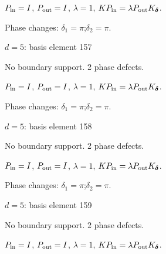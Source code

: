 \vspace{-1mm}
$P_{\rm in}=I$, \quad $P_{\rm out}=I$, \quad $\lambda=1$, \qquad $K P_{\rm in}=\lambda P_{\rm out}K_{\boldsymbol\delta}$.
\par\smallskip\begin{minipage}{.98\linewidth}\small Phase changes: $\delta_{1}=\pi$;\quad $\delta_{2}=\pi$.\end{minipage}
\vfill
{\footnotesize\texttt{}}
\newpage
{}
{\Large $d=5$: basis element 157}\par
No boundary support. 2 phase defects.
\begin{center}
\end{center}
\vspace{-1mm}
$P_{\rm in}=I$, \quad $P_{\rm out}=I$, \quad $\lambda=1$, \qquad $K P_{\rm in}=\lambda P_{\rm out}K_{\boldsymbol\delta}$.
\par\smallskip\begin{minipage}{.98\linewidth}\small Phase changes: $\delta_{1}=\pi$;\quad $\delta_{2}=\pi$.\end{minipage}
\vfill
{\footnotesize\texttt{}}
\newpage
{}
{\Large $d=5$: basis element 158}\par
No boundary support. 2 phase defects.
\begin{center}
\end{center}
\vspace{-1mm}
$P_{\rm in}=I$, \quad $P_{\rm out}=I$, \quad $\lambda=1$, \qquad $K P_{\rm in}=\lambda P_{\rm out}K_{\boldsymbol\delta}$.
\par\smallskip\begin{minipage}{.98\linewidth}\small Phase changes: $\delta_{1}=\pi$;\quad $\delta_{2}=\pi$.\end{minipage}
\vfill
{\footnotesize\texttt{}}
\newpage
{}
{\Large $d=5$: basis element 159}\par
No boundary support. 2 phase defects.
\begin{center}
\end{center}
\vspace{-1mm}
$P_{\rm in}=I$, \quad $P_{\rm out}=I$, \quad $\lambda=1$, \qquad $K P_{\rm in}=\lambda P_{\rm out}K_{\boldsymbol\delta}$.
